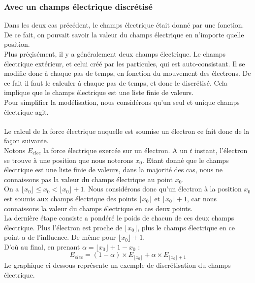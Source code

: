 \documentclass{article}
\begin{document}
\subsubsection*{Avec un champs électrique discrétisé}
Dans les deux cas précédent, le champs électrique était donné par une fonction. De ce fait, on pouvait savoir la valeur du champs électrique en n'importe quelle position.\\
Plus préçisément, il y a généralement deux champs électrique. Le champs électrique extérieur, et celui créé par les particules, qui est auto-consistant. Il se modifie donc à chaque pas de temps, en fonction du mouvement des électrons. De ce fait il faut le calculer à chaque pas de temps, et donc le discrétisé. Cela implique que le champs électrique est une liste finie de valeurs.\\
Pour simplifier la modélisation, nous considérons qu'un seul et unique champs électrique agit.\\
\\
Le calcul de la force électrique auquelle est soumise un électron ce fait donc de la façon suivante.\\
Notons $E_{elec}$ la force électrique exercée sur un électron. A un $t$ instant, l'électron se trouve à une position que nous noterons $x_0$. Etant donné que le champs électrique est une liste finie de valeurs, dans la majorité des cas, nous ne connaissons pas la valeur du champs électrique au point $x_0$.\\
On a $\lfloor x_0 \rfloor \leq x_0 < \lfloor x_0 \rfloor + 1$. Nous considérons donc qu'un électron à la position $x_0$ est soumis aux champs électrique des points $\lfloor x_0 \rfloor$ et $\lfloor x_0 \rfloor + 1$, car nous connaissons la valeur du champs électrique en ces deux points.\\
La dernière étape consiste a pondéré le poids de chacun de ces deux champs électrique. Plus l'électron est proche de $\lfloor x_0 \rfloor$, plus le champs électrique en ce point a de l'influence. De même pour $\lfloor x_0 \rfloor + 1$.\\
D'où au final, en prenant $\alpha = \lfloor x_0 \rfloor + 1 - x_0$ : $$E_{elec} = (1 - \alpha) \times E_{\lfloor x_0 \rfloor} + \alpha \times E_{\lfloor x_0 \rfloor + 1}$$
Le graphique ci-dessous représente un exemple de discrétisation du champs électrique.
\begin{center}
\end{center}
\end{document}
